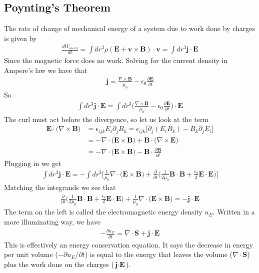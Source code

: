 \subsection{Poynting's Theorem}
The rate of change of mechanical energy of a system due to work done by charges is given by
\begin{align}
    \frac{dW_{mech}}{dt} = \int dr^3 \rho(\textbf{E} + \textbf{v}\times\textbf{B})\cdot\textbf{v} = \int dr^3 \textbf{j}\cdot\textbf{E}
\end{align}
Since the magnetic force does no work. Solving for the current density in Ampere's law we have that
\begin{align}
    \textbf{j} = \frac{\nabla\times\textbf{B}}{\mu_0} - \epsilon_0\frac{\partial\textbf{E}}{\partial t}
\end{align}
So
\begin{align}
    \int dr^3 \textbf{j}\cdot\textbf{E} = \int dr^3 \Big(\frac{\nabla\times\textbf{B}}{\mu_0} - \epsilon_0\frac{\partial\textbf{E}}{\partial t}\Big)\cdot\textbf{E}
\end{align}
The curl must act before the divergence, so let us look at the term
\begin{align}
    \textbf{E}\cdot\Big(\nabla\times\textbf{B}\Big) &= \epsilon_{ijk}E_i\partial_jB_k = \epsilon_{ijk} \Big[\partial_j (E_iB_k) - B_k\partial_jE_i\Big] \\
    &= -\nabla\cdot\Big(\textbf{E}\times\textbf{B}\Big) + \textbf{B}\cdot\Big(\nabla\times\textbf{E}\Big)\\
    &= - \nabla \cdot\Big(\textbf{E}\times\textbf{B}\Big) -\textbf{B}\cdot\frac{\partial\textbf{B}}{\partial t}
\end{align}
Plugging in we get
\begin{align}
    \int dr^3 \textbf{j}\cdot\textbf{E} = -\int dr^3 \Big[\frac{1}{\mu_0}\nabla\cdot\Big(\textbf{E}\times\textbf{B}\Big) + \frac{\partial}{\partial t}\Big(\frac{1}{2\mu_0} \textbf{B}\cdot\textbf{B} + \frac{\epsilon_0}{2}\textbf{E}\cdot\textbf{E}\Big)\Big]
\end{align}
Matching the integrands we see that
\begin{align}
     \frac{\partial}{\partial t}\Big(\frac{1}{2\mu_0} \textbf{B}\cdot\textbf{B} + \frac{\epsilon_0}{2}\textbf{E}\cdot\textbf{E}\Big) + \frac{1}{\mu_0}\nabla\cdot\Big(\textbf{E}\times\textbf{B}\Big)  = -\textbf{j}\cdot\textbf{E}
\end{align}
The term on the left is called the electromagnetic energy density $u_E$. Written in a more illuminating way, we have
\begin{align}
    -\frac{\partial u_E}{\partial t} = \nabla\cdot\textbf{S} + \textbf{j}\cdot\textbf{E}
\end{align}
This is effectively an energy conservation equation. It says the decrease in energy per unit volume ($-\partial u_E / \partial t$) is equal to the energy that leaves the volume ($\nabla\cdot\textbf{S}$) plus the work done on the charges ($\textbf{j}\cdot\textbf{E}$).




